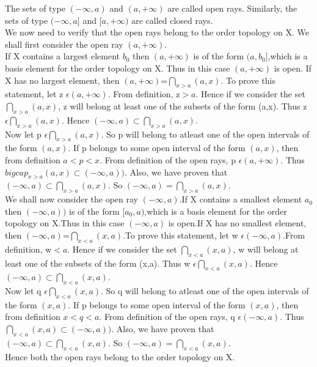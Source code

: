 \documentclass[a4paper,english,12pt]{article}
\begin{document}
\begin{flushleft}
The sets of type $(-\infty,a)$ and $(a,+\infty)$ are called open rays. Similarly, the sets of type $(-\infty,a]$ and $[a,+\infty)$ are called closed rays.\\
We now need to verify that the open rays belong to the order topology on X. We shall first consider the open ray $(a,+\infty)$.\\
If X contains a largest element $b_0$ then $(a,+\infty)$ is of the form $(a,b_0]$,which is a basis element for the order topology on X. Thus in this case $(a,+\infty)$ is open. If X has no largest element, then $(a,+\infty)$=$\bigcap_{x>a} (a,x)$. To prove this statement, let z $\epsilon (a,+\infty)$. From definition, z$>a$. Hence if we consider the set $\bigcap_{x>a} (a,x)$, z will belong at least one of the subsets of the form (a,x). Thus z $\epsilon \bigcap_{x>a} (a,x)$. Hence $(-\infty,a) \subset \bigcap_{x>a} (a,x)$.\\
Now let p $\epsilon \bigcap_{x>a} (a,x)$. So p will belong to atleast one of the open intervals of the form $(a,x)$. If p belongs to some open interval of the form $(a,x)$, then from definition $a<p<x$. From definition of the open rays, p $\epsilon (a,+\infty)$. Thus $bigcap_{x>a} (a,x)\subset (-\infty,a))$. Also, we have proven that $(-\infty,a) \subset \bigcap_{x>a} (a,x)$. So $(-\infty,a)=\bigcap_{x>a} (a,x)$.\\
We shall now consider the open ray $(-\infty,a)$.If X contains a smallest element $a_0$ then $(-\infty,a))$ is of the form $[a_0,a)$,which is a basis element for the order topology on X.Thus in this case $(-\infty,a)$ is open.If X has no smallest element, then $(-\infty,a)$=$\bigcap_{x<a} (x,a)$.To prove this statement, let w $\epsilon (-\infty,a)$.From definition, w$<a$. Hence if we consider the set $\bigcap_{x<a} (x,a)$, w will belong at least one of the subsets of the form (x,a). Thus w $\epsilon \bigcap_{x<a} (x,a)$. Hence $(-\infty,a) \subset \bigcap_{x<a} (x,a)$.\\
Now let q $\epsilon \bigcap_{x<a} (x,a)$. So q will belong to atleast one of the open intervals of the form $(x,a)$. If p belongs to some open interval of the form $(x,a)$, then from definition $x<q<a$. From definition of the open rays, q $\epsilon (-\infty,a)$. Thus $\bigcap_{x<a} (x,a)\subset (-\infty,a))$. Also, we have proven that $(-\infty,a) \subset \bigcap_{x<a} (x,a)$. So $(-\infty,a)=\bigcap_{x<a} (x,a)$.\\
Hence both the open rays belong to the order topology on X.\\
\vspace{2mm}

\end{flushleft}
\end{document}
